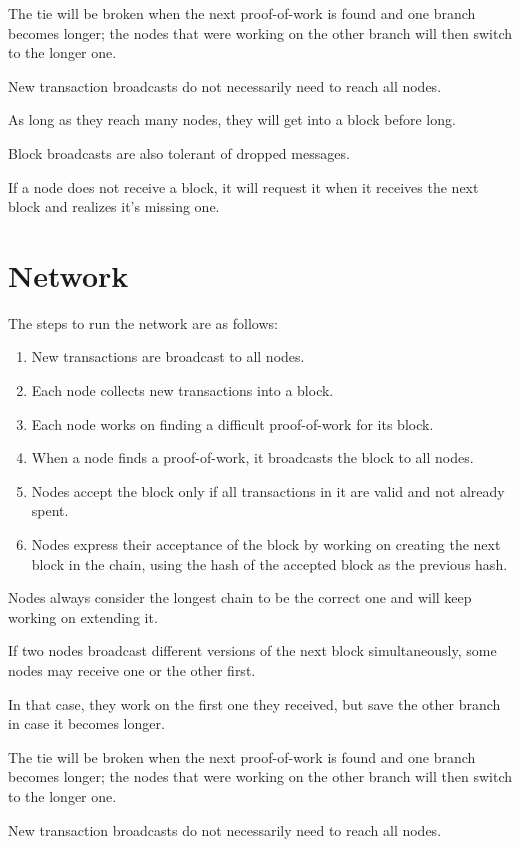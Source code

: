 \documentclass{article}
\begin{document}
The tie will be broken when the next proof-of-work is found and one branch becomes longer; the nodes that were working on the other branch will then switch to the longer one.

New transaction broadcasts do not necessarily need to reach all nodes.

As long as they reach many nodes, they will get into a block before long.

Block broadcasts are also tolerant of dropped messages.

If a node does not receive a block, it will request it when it receives the next block and realizes it's missing one.

\section{Network}
The steps to run the network are as follows:

\begin{enumerate}
\item New transactions are broadcast to all nodes.
\item Each node collects new transactions into a block.
\item Each node works on finding a difficult proof-of-work for its block.
\item When a node finds a proof-of-work, it broadcasts the block to all nodes.
\item Nodes accept the block only if all transactions in it are valid and not already spent.
\item Nodes express their acceptance of the block by working on creating the next block in the chain, using the hash of the accepted block as the previous hash.
\end{enumerate}

Nodes always consider the longest chain to be the correct one and will keep working on extending it.

If two nodes broadcast different versions of the next block simultaneously, some nodes may receive one or the other first.

In that case, they work on the first one they received, but save the other branch in case it becomes longer.

The tie will be broken when the next proof-of-work is found and one branch becomes longer; the nodes that were working on the other branch will then switch to the longer one.

New transaction broadcasts do not necessarily need to reach all nodes.
\end{document}
